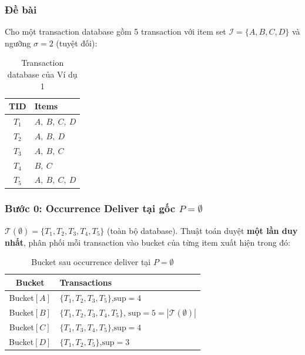 \documentclass[12pt,a4paper]{article}
\theoremstyle{definition}
\begin{document}
\subsubsection{Đề bài}

Cho một transaction database gồm 5 transaction với item set $\mathcal{I} = \{A, B, C, D\}$ và ngưỡng $\sigma = 2$ (tuyệt đối):

\begin{table}[H]
\centering
\begin{tabular}{c l}
    \toprule
    \textbf{TID} & \textbf{Items} \\
    \midrule
    $T_1$ & $A,\ B,\ C,\ D$ \\
    $T_2$ & $A,\ B,\ D$ \\
    $T_3$ & $A,\ B,\ C$ \\
    $T_4$ & $B,\ C$ \\
    $T_5$ & $A,\ B,\ C,\ D$ \\
    \bottomrule
\end{tabular}
\caption{Transaction database của Ví dụ 1}
\label{tab:ex1_db}
\end{table}

\subsubsection{Bước 0: Occurrence Deliver tại gốc $P = \emptyset$}

$\mathcal{T}(\emptyset) = \{T_1,T_2,T_3,T_4,T_5\}$ (toàn bộ database).
Thuật toán duyệt \textbf{một lần duy nhất}, phân phối mỗi transaction
vào bucket của từng item xuất hiện trong đó:

\begin{table}[H]
\centering
\begin{tabular}{c l}
    \toprule
    \textbf{Bucket} & \textbf{Transactions} \\
    \midrule
    Bucket$[A]$ & $\{T_1,T_2,T_3,T_5\}$,\quad $\mathrm{sup}=4$ \\
    Bucket$[B]$ & $\{T_1,T_2,T_3,T_4,T_5\}$,\quad
                  $\mathrm{sup}=5 = |\mathcal{T}(\emptyset)|$ \\
    Bucket$[C]$ & $\{T_1,T_3,T_4,T_5\}$,\quad $\mathrm{sup}=4$ \\
    Bucket$[D]$ & $\{T_1,T_2,T_5\}$,\quad $\mathrm{sup}=3$ \\
    \bottomrule
\end{tabular}
\caption{Bucket sau occurrence deliver tại $P=\emptyset$}
\label{tab:bucket_root}
\end{table}
\end{document}
